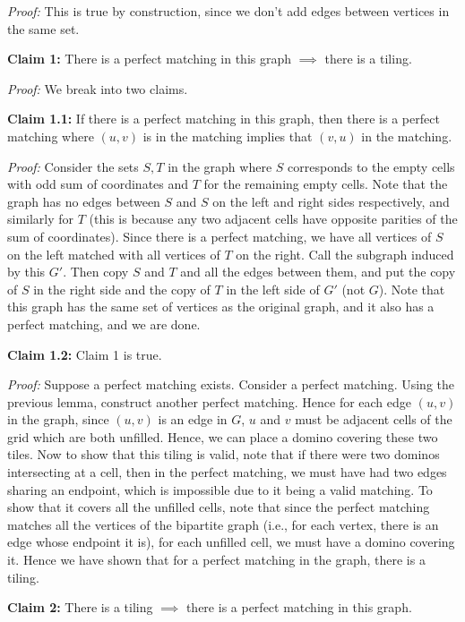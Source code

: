 \documentclass[answers]{exam}
\begin{document}
\begin{questions}
\begin{solution}
        \textit{Proof:} This is true by construction, since we don't add edges between vertices in the same set.

        \textbf{Claim 1:} There is a perfect matching in this graph $\implies$ there is a tiling.

        \textit{Proof:} We break into two claims.

        \textbf{Claim 1.1:} If there is a perfect matching in this graph, then there is a perfect matching where $(u, v)$ is in the matching implies that $(v, u)$ in the matching.

        \textit{Proof:} Consider the sets $S, T$ in the graph where $S$ corresponds to the empty cells with odd sum of coordinates and $T$ for the remaining empty cells. Note that the graph has no
        edges between $S$ and $S$ on the left and right sides respectively, and similarly for $T$ (this is because any two adjacent cells have opposite parities of the sum of coordinates). Since there
        is a perfect matching, we have all vertices of $S$ on the left matched with all vertices of $T$ on the right. Call the subgraph induced by this $G'$. Then copy $S$ and $T$ and all the edges
        between them, and put the copy of $S$ in the right side and the copy of $T$ in the left side of $G'$ (not $G$). Note that this graph has the same set of vertices as the original graph, and it also has a perfect matching, and we are done.

        \textbf{Claim 1.2:} Claim 1 is true.

        \textit{Proof:} Suppose a perfect matching exists. Consider a perfect matching. Using the previous lemma, construct another perfect matching. Hence for each edge $(u, v)$ in the graph, since
        $(u, v)$ is an edge in $G$, $u$ and $v$ must be adjacent cells of the grid which are both unfilled. Hence, we can place a domino covering these two tiles. Now to show that this tiling is valid, note that if there were two dominos intersecting at a cell, then in the perfect matching, we must have had two edges sharing an endpoint, which is impossible due to it being a valid matching. To show that it covers all the unfilled cells, note that since the perfect matching matches all the vertices of the bipartite graph (i.e., for each vertex, there is an edge whose endpoint it is), for each unfilled cell, we must have a domino covering it. Hence we have shown that for a perfect matching in the graph, there is a tiling.

        \textbf{Claim 2:} There is a tiling $\implies$ there is a perfect matching in this graph.


\end{solution}
\end{questions}
\end{document}
